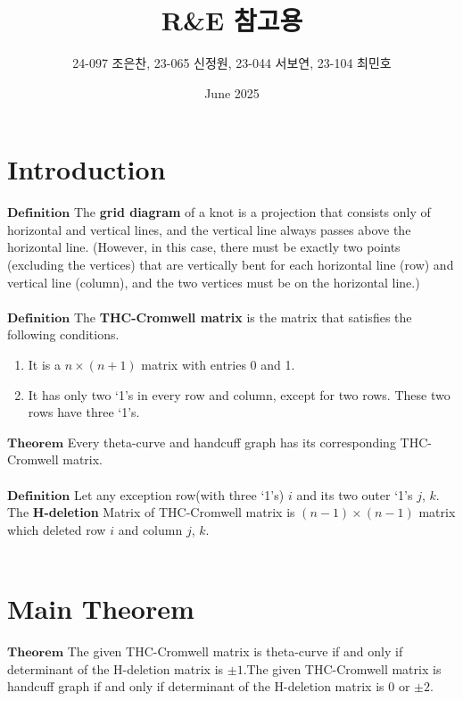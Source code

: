 \documentclass{article}
\title{R\&E 참고용}
\author{24-097 조은찬, 23-065 신정원, 23-044 서보연, 23-104 최민호}
\date{June 2025}
\begin{document}
\maketitle

\section{Introduction}
$\mathbf{Definition}$ The \textbf{grid diagram} of a knot is a projection that consists only of horizontal and vertical lines, and the vertical line always passes above the horizontal line. (However, in this case, there must be exactly two points (excluding the vertices) that are vertically bent for each horizontal line (row) and vertical line (column), and the two vertices must be on the horizontal line.) \\ \\
$\mathbf{Definition}$ The \textbf{THC-Cromwell matrix} is the matrix that satisfies the following conditions.
\begin{enumerate}
    \item It is a $n\times(n+1)$ matrix with entries 0 and 1.
    \item It has only two `1's in every row and column, except for two rows. These two rows have three `1's.
\end{enumerate}
$\mathbf{Theorem}$ Every theta-curve and handcuff graph has its corresponding THC-Cromwell matrix. \\ \\
$\mathbf{Definition}$ Let any exception row(with three `1's) $i$ and its two outer `1's $j$, $k$. The \textbf{H-deletion} Matrix of THC-Cromwell matrix is $(n-1)\times(n-1)$ matrix which deleted row $i$ and column $j$, $k$.\\ \\
\section{Main Theorem}
$\mathbf{Theorem}$ The given THC-Cromwell matrix is theta-curve if and only if determinant of the H-deletion matrix is $\pm 1$.The given THC-Cromwell matrix is handcuff graph if and only if determinant of the H-deletion matrix is 0 or $\pm 2$.
\end{document}
